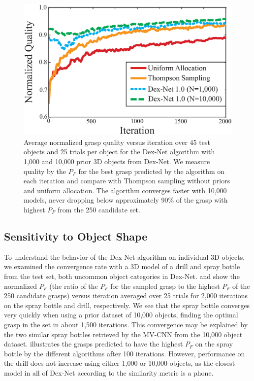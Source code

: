\begin{figure}[t!]
\centering
\includegraphics[scale=0.40]{figures/illustrations/avg_reward.eps}
\caption{Average normalized grasp quality versus iteration over 45 test objects and 25 trials per object for the Dex-Net algorithm with 1,000 and 10,000 prior 3D objects from Dex-Net. We measure quality by the $P_F$ for the best grasp predicted by the algorithm on each iteration and compare with Thompson sampling without priors and uniform allocation. The algorithm converges faster with 10,000 models, never dropping below approximately 90\% of the grasp with highest $P_F$ from the 250 candidate set.}
\vspace*{-10pt}
\end{figure}

\subsection{Sensitivity to Object Shape}
To understand the behavior of the Dex-Net algorithm on individual 3D objects, we examined the convergence rate with a 3D model of a drill and spray bottle from the test set, both uncommon object categories in Dex-Net.
 and   show the normalized $P_F$ (the ratio of the $P_F$ for the sampled grasp to the highest $P_F$ of the 250 candidate grasps) versus iteration averaged over 25 trials for 2,000 iterations on the spray bottle and drill, respectively.
We see that the spray bottle converges very quickly when using a prior dataset of 10,000 objects, finding the optimal grasp in the set in about 1,500 iterations.
This convergence may be explained by the two similar spray bottles retrieved by the MV-CNN from the 10,000 object dataset.
 illustrates the grasps predicted to have the highest $P_F$ on the spray bottle by the different algorithms after 100 iterations.
However, performance on the drill does not increase using either 1,000 or 10,000 objects, as the closest model in all of Dex-Net according to the similarity metric is a phone.

